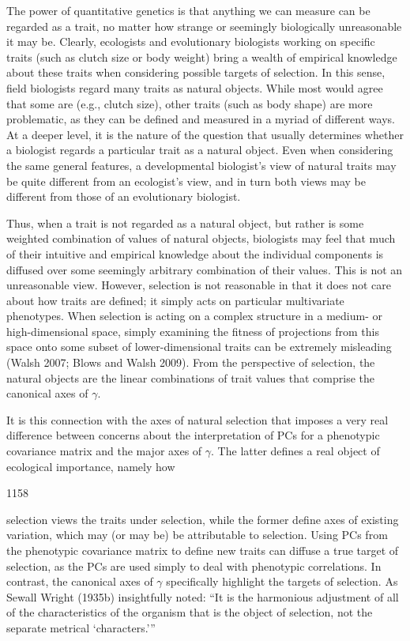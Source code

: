 \documentclass{article}
\begin{document}
The power of quantitative genetics is that anything we can measure can be regarded as a trait, no matter how strange or seemingly biologically unreasonable it may be. Clearly, ecologists and evolutionary biologists working on specific traits (such as clutch size or body weight) bring a wealth of empirical knowledge about these traits when considering possible targets of selection. In this sense, field biologists regard many traits as natural objects. While most would agree that some are (e.g., clutch size), other traits (such as body shape) are more problematic, as they can be defined and measured in a myriad of different ways. At a deeper level, it is the nature of the question that usually determines whether a biologist regards a particular trait as a natural object. Even when considering the same general features, a developmental biologist's view of natural traits may be quite different from an ecologist's view, and in turn both views may be different from those of an evolutionary biologist.

Thus, when a trait is not regarded as a natural object, but rather is some weighted combination of values of natural objects, biologists may feel that much of their intuitive and empirical knowledge about the individual components is diffused over some seemingly arbitrary combination of their values. This is not an unreasonable view. However, selection is not reasonable in that it does not care about how traits are defined; it simply acts on particular multivariate phenotypes. When selection is acting on a complex structure in a medium- or high-dimensional space, simply examining the fitness of projections from this space onto some subset of lower-dimensional traits can be extremely misleading (Walsh 2007; Blows and Walsh 2009). From the perspective of selection, the natural objects are the linear combinations of trait values that comprise the canonical axes of  $ \gamma $.

It is this connection with the axes of natural selection that imposes a very real difference between concerns about the interpretation of PCs for a phenotypic covariance matrix and the major axes of  $ \gamma $. The latter defines a real object of ecological importance, namely how

1158

selection views the traits under selection, while the former define axes of existing variation, which may (or may be) be attributable to selection. Using PCs from the phenotypic covariance matrix to define new traits can diffuse a true target of selection, as the PCs are used simply to deal with phenotypic correlations. In contrast, the canonical axes of  $ \gamma $ specifically highlight the targets of selection. As Sewall Wright (1935b) insightfully noted: “It is the harmonious adjustment of all of the characteristics of the organism that is the object of selection, not the separate metrical ‘characters.’”
\end{document}
